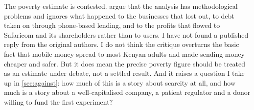 \begin{counterpoint}
The poverty estimate is contested. \textcite{bateman2019} argue that the
\textcite{suri2016} analysis has methodological problems and ignores what
happened to the businesses that lost out, to debt taken on through
phone-based lending, and to the profits that flowed to Safaricom and its
shareholders rather than to users. I have not found a published reply from the
original authors. I do not think the critique overturns the basic fact that
mobile money spread to most Kenyan adults and made sending money cheaper and
safer. But it does mean the precise poverty figure should be treated as an
estimate under debate, not a settled result. And it raises a question I take
up in \cref{sec:against}: how much of this is a story about scarcity at all,
and how much is a story about a well-capitalised company, a patient regulator
and a donor willing to fund the first experiment?
\end{counterpoint}
